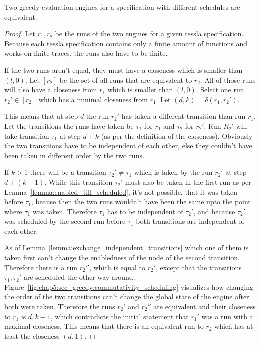 \begin{theorem}[name = Equivalence of Different Greedy Evaluation Engines]\label{theorem:equivalence_greedy_eval_engines}
  Two greedy evaluation engines for a specification with different schedules are equivalent.
\end{theorem}
\begin{proof}

  Let \(r_1, r_2\) be the runs of the two engines for a given \gls{tessla} specification.
  Because each \gls{tessla} specification contains only a finite amount of functions and works on finite traces, the runs also have to be finite.

If the two runs aren't equal, they must have a closeness which is smaller than \((l, 0)\).
Let \([r_2]\) be the set of all runs that are equivalent to \(r_2\).
All of those runs will also have a closeness from \(r_1\) which is smaller than \((l, 0)\).
Select one run \(r_2' \in [r_2]\) which has a minimal closeness from \(r_1\).
Let \((d,k) = \delta(r_1, r_2')\).

This means that at step \(d\) the run \(r_2'\) has taken a different transition than run \(r_1\).
Let the transitions the runs have taken be \(\tau_1\) for \(r_1\) and \(\tau_2\) for \(r_2'\).
Run \(R_2'\) will take transition \(\tau_1\) at step \(d+k\) (as per the definition of the closeness).
Obviously the two transitions have to be independent of each other, else they couldn't have been taken in different order by the two runs.

If \(k > 1\) there will be a transition \(\tau_2' \neq \tau_1\) which is taken by the run \(r_2'\) at step \(d+(k-1)\).
While this transition \(\tau_2'\) must also be taken in the first run as per Lemma~\ref{lemma:enabled_till_scheduled}, it's not possible, that it was taken before \(\tau_1\), beause then the two runs wouldn't have been the same upto the point where \(\tau_1\) was taken.
Therefore \(\tau_1\) has to be independent of \(\tau_2'\), and because \(\tau_2'\) was scheduled by the second run before \(\tau_1\) both transitions are independent of each other.

As of Lemma~\ref{lemma:exchange_independent_transitions} which one of them is taken first can't change the enabledness of the node of the second transition.
Therefore there is a run \(r_2''\), which is equal to \(r_2'\), except that the transitions \(\tau_1, \tau_2'\) are scheduled the other way around.
Figure~\ref{fig:chap5:sec_greedy:commutativity_scheduling} visualizes how changing the order of the two transitions can't change the global state of the engine after both were taken.
Therefore the runs \(r_2'\) and \(r_2''\) are equivalent and their closeness to \(r_1\) is \(d, k-1\), which contradicts the initial statement that \(r_1'\) was a run with a maximal closeness.
This means that there is an equivalent run to \(r_2\) which has at least the closeness \((d, 1)\).


\end{proof}
